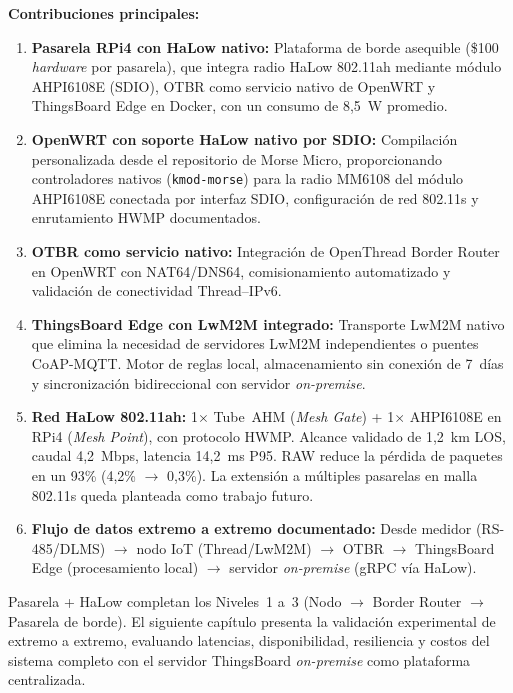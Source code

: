 \textbf{Contribuciones principales:}
\begin{enumerate}
    \item \textbf{Pasarela RPi4 con HaLow nativo:} Plataforma de borde asequible (\$100 \emph{hardware} por pasarela), que integra radio HaLow 802.11ah mediante módulo AHPI6108E (SDIO), OTBR como servicio nativo de OpenWRT y ThingsBoard Edge en Docker, con un consumo de 8,5~W promedio.

    \item \textbf{OpenWRT con soporte HaLow nativo por SDIO:} Compilación personalizada desde el repositorio de Morse Micro, proporcionando controladores nativos (\texttt{kmod-morse}) para la radio MM6108 del módulo AHPI6108E conectada por interfaz SDIO, configuración de red 802.11s y enrutamiento HWMP documentados.

    \item \textbf{OTBR como servicio nativo:} Integración de OpenThread Border Router en OpenWRT con NAT64/DNS64, comisionamiento automatizado y validación de conectividad Thread--IPv6.

    \item \textbf{ThingsBoard Edge con LwM2M integrado:} Transporte LwM2M nativo que elimina la necesidad de servidores LwM2M independientes o puentes CoAP-MQTT.  Motor de reglas local, almacenamiento sin conexión de 7~días y sincronización bidireccional con servidor \emph{on-premise}.

    \item \textbf{Red HaLow 802.11ah:} 1$\times$ Tube~AHM (\emph{Mesh Gate}) + 1$\times$ AHPI6108E en RPi4 (\emph{Mesh Point}), con protocolo HWMP.  Alcance validado de 1,2~km LOS, caudal 4,2~Mbps, latencia 14,2~ms P95.  RAW reduce la pérdida de paquetes en un 93\% (4,2\% $\rightarrow$ 0,3\%).  La extensión a múltiples pasarelas en malla 802.11s queda planteada como trabajo futuro.

    \item \textbf{Flujo de datos extremo a extremo documentado:} Desde medidor (RS-485/DLMS) $\rightarrow$ nodo IoT (Thread/LwM2M) $\rightarrow$ OTBR $\rightarrow$ ThingsBoard Edge (procesamiento local) $\rightarrow$ servidor \emph{on-premise} (gRPC vía HaLow).
\end{enumerate}

Pasarela + HaLow completan los Niveles~1 a~3 (Nodo $\rightarrow$ Border Router $\rightarrow$ Pasarela de borde). El siguiente capítulo presenta la validación experimental de extremo a extremo, evaluando latencias, disponibilidad, resiliencia y costos del sistema completo con el servidor ThingsBoard \emph{on-premise} como plataforma centralizada.